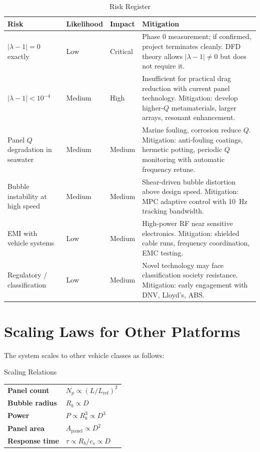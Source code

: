 \documentclass[11pt]{article}
\begin{document}
\begin{longtable}{@{}p{4cm}p{1.5cm}p{1.5cm}p{6cm}@{}}
\caption{Risk Register} \\
\toprule
\textbf{Risk} & \textbf{Likelihood} & \textbf{Impact} & \textbf{Mitigation} \\
\midrule
\endfirsthead
\midrule
\endhead
$|\lambda - 1| = 0$ exactly & Low & Critical &
Phase 0 measurement; if confirmed, project terminates cleanly.
DFD theory allows $|\lambda - 1| \neq 0$ but does not require it. \\
\addlinespace
$|\lambda - 1| < 10^{-4}$ & Medium & High &
Insufficient for practical drag reduction with current panel technology.
Mitigation: develop higher-$Q$ metamaterials, larger arrays, resonant
enhancement. \\
\addlinespace
Panel $Q$ degradation in seawater & Medium & Medium &
Marine fouling, corrosion reduce $Q$. Mitigation: anti-fouling coatings,
hermetic potting, periodic $Q$ monitoring with automatic frequency retune. \\
\addlinespace
Bubble instability at high speed & Medium & Medium &
Shear-driven bubble distortion above design speed. Mitigation: MPC
adaptive control with 10~Hz tracking bandwidth. \\
\addlinespace
EMI with vehicle systems & Low & Medium &
High-power RF near sensitive electronics. Mitigation: shielded cable runs,
frequency coordination, EMC testing. \\
\addlinespace
Regulatory / classification & Low & Medium &
Novel technology may face classification society resistance. Mitigation:
early engagement with DNV, Lloyd's, ABS. \\
\bottomrule
\end{longtable}

\section{Scaling Laws for Other Platforms}
\label{sec:scaling}

The system scales to other vehicle classes as follows:

\begin{specbox}{Scaling Relations}
\begin{tabular}{@{}ll@{}}
\textbf{Panel count} & $N_p \propto (L/L_\mathrm{ref})^2$ \\
\textbf{Bubble radius} & $R_b \propto D$ \\
\textbf{Power} & $P \propto R_b^3 \propto D^3$ \\
\textbf{Panel area} & $A_\mathrm{panel} \propto D^2$ \\
\textbf{Response time} & $\tau \propto R_b / c_s \propto D$ \\
\end{tabular}
\end{specbox}
\end{document}
